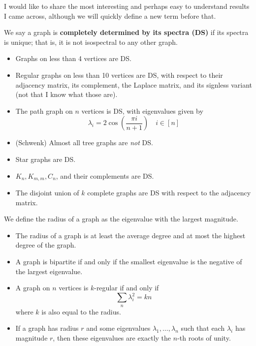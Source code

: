 \documentclass{article}
\begin{document}
I would like to share the most interesting and perhaps easy to understand results I came across, although we will quickly define a new term before that.

\begin{defn}
We say a graph is \textbf{completely determined by its spectra (DS)} if its spectra is unique; that is, it is not isospectral to any other graph.
\end{defn}

\begin{crll}[source=\augh \aaugh]
\begin{itemize}
    \item Graphs on less than 4 vertices are DS.
    \item Regular graphs on less than 10 vertices are DS, with respect to
    their adjacency matrix, its complement, the Laplace matrix, and its signless variant (not that I know what those are).
    \item The path graph on $n$ vertices is DS, with eigenvalues given by
    \begin{equation*}
        \lambda_i = 2\cos \left( \frac{\pi i}{n + 1} \right) \quad i \in [n]
    \end{equation*}
    \item (Schwenk) Almost all tree graphs are \textit{not} DS.
    \item Star graphs are DS.
    \item $K_n, K_{m,m}, C_n$, and their complements are DS.
    \item The disjoint union of $k$ complete graphs are DS with respect to
    the adjacency matrix.
\end{itemize}
We define the radius of a graph as the eigenvalue with the largest magnitude.
\begin{itemize}
    \item The radius of a graph is at least the average degree and at most
    the highest degree of the graph.
    \item A graph is bipartite if and only if the smallest eigenvalue is the
    negative of the largest eigenvalue.
    \item A graph on $n$ vertices is $k$-regular if and only if
    \begin{equation*}
        \sum_{n} \lambda_i^2 = kn
    \end{equation*}
    where $k$ is also equal to the radius.
    \item If a graph has radius $r$ and some eigenvalues $\lambda_1, \dots, \lambda_n$ such that each $\lambda_i$ has magnitude $r$, then these
    eigenvalues are exactly the $n$-th roots of unity.
\end{itemize}
\end{crll}
\end{document}
